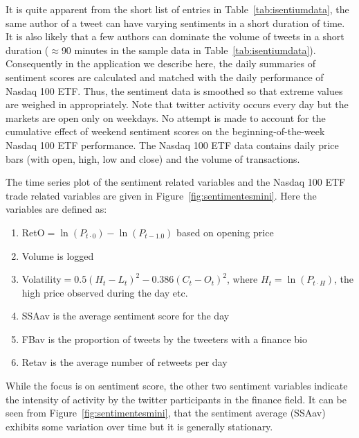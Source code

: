 It is quite apparent from the short list of entries in Table~\ref{tab:isentiumdata}, the same author of a tweet can have varying sentiments in a short duration of time. It is also likely that a few authors can dominate the volume of tweets in a short duration ($\approx$90 minutes in the sample data in Table~\ref{tab:isentiumdata}). Consequently in the application we describe here, the daily summaries of sentiment scores are calculated and matched with the daily performance of Nasdaq 100 ETF. Thus, the sentiment data is smoothed so that extreme values are weighed in appropriately. Note that twitter activity occurs every day but the markets are open only on weekdays. No attempt is made to account for the cumulative effect of weekend sentiment scores on the beginning-of-the-week Nasdaq 100 ETF performance. The Nasdaq 100 ETF data contains daily price bars (with open, high, low and close) and the volume of transactions.


The time series plot of the sentiment related variables and the Nasdaq 100 ETF trade related variables are given in Figure~\ref{fig:sentimentesmini}. Here the variables are defined as:
        \begin{enumerate}[--]
        \item RetO$=\ln(P_{t \cdot 0}) - \ln(P_{t-1.0})$ based on opening price
        \item Volume is logged
        \item Volatility$= 0.5(H_t-L_t)^2 - 0.386(C_t-O_t)^2$, where $H_t=\ln(P_{t \cdot H})$, the high price observed during the day etc.
        \item SSAav is the average sentiment score for the day
        \item FBav is the proportion of tweets by the tweeters with a finance bio
        \item Retav is the average number of retweets per day 
        \end{enumerate}
While the focus is on sentiment score, the other two sentiment variables indicate the intensity of activity by the twitter participants in the finance field. It can be seen from Figure~\ref{fig:sentimentesmini}, that the sentiment average (SSAav) exhibits some variation over time but it is generally stationary. 

